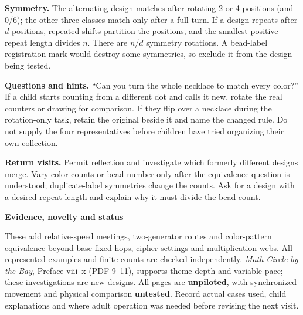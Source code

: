 \documentclass[11pt]{article}
\newcommand\lead[1]{\textbf{#1}\par}
\begin{document}
\textbf{Symmetry.} The alternating design matches after rotating 2 or 4 positions (and 0/6); the other three classes match only after a full turn. If a design repeats after $d$ positions, repeated shifts partition the positions, and the smallest positive repeat length divides $n$. There are $n/d$ symmetry rotations. A bead-label registration mark would destroy some symmetries, so exclude it from the design being tested.

\textbf{Questions and hints.} ``Can you turn the whole necklace to match every color?'' If a child starts counting from a different dot and calls it new, rotate the real counters or drawing for comparison. If they flip over a necklace during the rotation-only task, retain the original beside it and name the changed rule. Do not supply the four representatives before children have tried organizing their own collection.

\textbf{Return visits.} Permit reflection and investigate which formerly different designs merge. Vary color counts or bead number only after the equivalence question is understood; duplicate-label symmetries change the counts. Ask for a design with a desired repeat length and explain why it must divide the bead count.

\lead{Evidence, novelty and status}
These add relative-speed meetings, two-generator routes and color-pattern equivalence beyond base fixed hops, cipher settings and multiplication webs. All represented examples and finite counts are checked independently. \emph{Math Circle by the Bay}, Preface viii--x (PDF 9--11), supports theme depth and variable pace; these investigations are new designs. All pages are \textbf{unpiloted}, with synchronized movement and physical comparison \textbf{untested}. Record actual cases used, child explanations and where adult operation was needed before revising the next visit.
\end{document}
